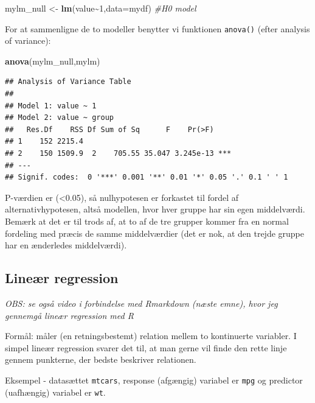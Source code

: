 \documentclass[
]{book}
\newenvironment{Shaded}{\begin{snugshade}}{\end{snugshade}}
\newcommand{\AttributeTok}[1]{\textcolor[rgb]{0.13,0.29,0.53}{#1}}
\newcommand{\CommentTok}[1]{\textcolor[rgb]{0.56,0.35,0.01}{\textit{#1}}}
\newcommand{\DecValTok}[1]{\textcolor[rgb]{0.00,0.00,0.81}{#1}}
\newcommand{\FunctionTok}[1]{\textcolor[rgb]{0.13,0.29,0.53}{\textbf{#1}}}
\newcommand{\NormalTok}[1]{#1}
\newcommand{\OtherTok}[1]{\textcolor[rgb]{0.56,0.35,0.01}{#1}}
\newcommand{\SpecialCharTok}[1]{\textcolor[rgb]{0.81,0.36,0.00}{\textbf{#1}}}
\begin{document}
\begin{Shaded}
\begin{Highlighting}[]
\NormalTok{mylm\_null }\OtherTok{\textless{}{-}} \FunctionTok{lm}\NormalTok{(value}\SpecialCharTok{\textasciitilde{}}\DecValTok{1}\NormalTok{,}\AttributeTok{data=}\NormalTok{mydf) }\CommentTok{\#H0 model}
\end{Highlighting}
\end{Shaded}

For at sammenligne de to modeller benytter vi funktionen \texttt{anova()} (efter analysis of variance):

\begin{Shaded}
\begin{Highlighting}[]
\FunctionTok{anova}\NormalTok{(mylm\_null,mylm)}
\end{Highlighting}
\end{Shaded}

\begin{verbatim}
## Analysis of Variance Table
## 
## Model 1: value ~ 1
## Model 2: value ~ group
##   Res.Df    RSS Df Sum of Sq      F    Pr(>F)    
## 1    152 2215.4                                  
## 2    150 1509.9  2    705.55 35.047 3.245e-13 ***
## ---
## Signif. codes:  0 '***' 0.001 '**' 0.01 '*' 0.05 '.' 0.1 ' ' 1
\end{verbatim}

P-værdien er (\textless0.05), så nulhypotesen er forkastet til fordel af alternativhypotesen, altså modellen, hvor hver gruppe har sin egen middelværdi. Bemærk at det er til trods af, at to af de tre grupper kommer fra en normal fordeling med præcis de samme middelværdier (det er nok, at den trejde gruppe har en ænderledes middelværdi).

\subsection{Lineær regression}\label{lineuxe6r-regression}

\emph{OBS: se også video i forbindelse med Rmarkdown (næste emne), hvor jeg gennemgå lineær regression med R}

Formål: måler (en retningsbestemt) relation mellem to kontinuerte variabler. I simpel lineær regression svarer det til, at man gerne vil finde den rette linje gennem punkterne, der bedste beskriver relationen.

Eksempel - datasættet \texttt{mtcars}, response (afgængig) variabel er \texttt{mpg} og predictor (uafhængig) variabel er \texttt{wt}.
\end{document}
